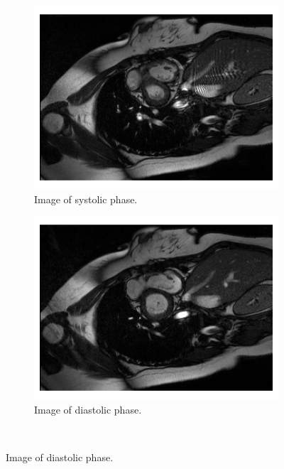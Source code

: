 \begin{figure}[h]%
	\centering
	\graphicspath{{images/}{\main/images/}}
	\begin{subfigure}{0.4\textwidth}
    		\includegraphics[width=\textwidth]{Image_ACDC_systolic.png}
    		\caption{Image of systolic phase.}
    		\label{fig:Image_ACDC_systolic}
	\end{subfigure}
	\hfill
	\graphicspath{{images/}{\main/images/}}
	\begin{subfigure}{0.4\textwidth}
    		\includegraphics[width=\textwidth]{Image_ACDC_diastolic.png}
    		\caption{Image of diastolic phase.}
    		\label{fig:Image_ACDC_diastolic}
	\end{subfigure} 
	\\

\end{figure}
